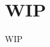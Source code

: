 \chapter[WIP]{WIP}
\label{Chapter3}
\doublespacing
\fontsize{14}{14}\selectfont
\indent WIP \cite{clegg}
